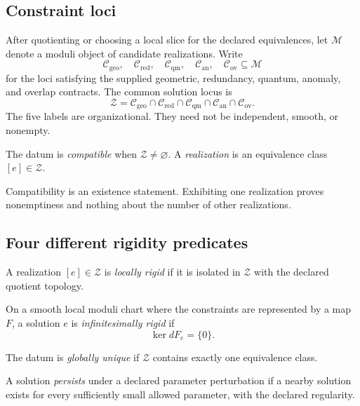 \documentclass[11pt]{article}
\newcommand{\Mod}{\mathcal M}
\newcommand{\Sol}{\mathcal Z}
\newcommand{\Geo}{\mathcal C_{\mathrm{geo}}}
\newcommand{\Red}{\mathcal C_{\mathrm{red}}}
\newcommand{\Qua}{\mathcal C_{\mathrm{qm}}}
\newcommand{\Ano}{\mathcal C_{\mathrm{an}}}
\newcommand{\Ovl}{\mathcal C_{\mathrm{ov}}}
\begin{document}
\subsection{Constraint loci}

After quotienting or choosing a local slice for the declared equivalences, let
$\Mod$ denote a moduli object of candidate realizations.  Write
\[
 \Geo,\quad \Red,\quad \Qua,\quad \Ano,\quad \Ovl
 \subseteq \Mod
\]
for the loci satisfying the supplied geometric, redundancy, quantum, anomaly,
and overlap contracts.  The common solution locus is
\[
 \Sol
 =
 \Geo\cap\Red\cap\Qua\cap\Ano\cap\Ovl.
\]
The five labels are organizational.  They need not be independent, smooth, or
nonempty.

\begin{definition}
The datum is \emph{compatible} when $\Sol\ne\varnothing$.  A
\emph{realization} is an equivalence class $[e]\in\Sol$.
\end{definition}

Compatibility is an existence statement.  Exhibiting one realization proves
nonemptiness and nothing about the number of other realizations.

\subsection{Four different rigidity predicates}

\begin{definition}\label{def:local-rigidity}
A realization $[e]\in\Sol$ is \emph{locally rigid} if it is isolated in
$\Sol$ with the declared quotient topology.
\end{definition}

\begin{definition}\label{def:inf-rigidity}
On a smooth local moduli chart where the constraints are represented by a map
$F$, a solution $e$ is \emph{infinitesimally rigid} if
\[
 \ker dF_e=\{0\}.
\]
\end{definition}

\begin{definition}
The datum is \emph{globally unique} if $\Sol$ contains exactly one equivalence
class.
\end{definition}

\begin{definition}[Persistence]
A solution \emph{persists} under a declared parameter perturbation if a nearby
solution exists for every sufficiently small allowed parameter, with the
declared regularity.
\end{definition}
\end{document}

